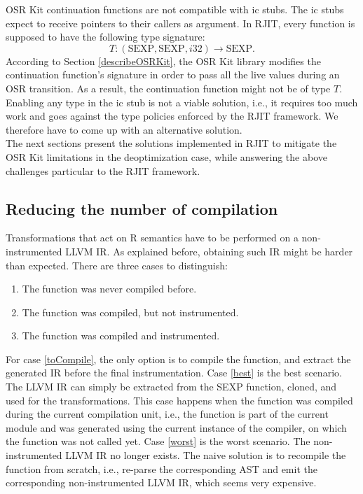 OSR Kit continuation functions are not compatible with ic stubs.
The ic stubs expect to receive pointers to their callers as argument.
In RJIT, every function is supposed to have the following type signature:
$$T: (\text{SEXP}, \text{SEXP}, i32) \rightarrow \text{SEXP}.$$
According to Section \ref{describeOSRKit}, the OSR Kit\cite{OSRKit} library modifies the continuation function's signature in order to pass all the live values during an OSR transition.
As a result, the continuation function might not be of type $T$.
Enabling any type in the ic stub is not a viable solution, i.e., it requires too much work and goes against the type policies enforced by the RJIT framework. 
We therefore have to come up with an alternative solution.\\

The next sections present the solutions implemented in RJIT to mitigate the OSR Kit limitations in the deoptimization case, while answering the above challenges particular to the RJIT framework.\\

\subsection{Reducing the number of compilation}\label{section:reducecompilations}

Transformations that act on R semantics have to be performed on a non-instrumented LLVM IR.
As explained before, obtaining such IR might be harder than expected. 
There are three cases to distinguish:
\begin{enumerate}
    \item The function was never compiled before.\label{toCompile}
    \item The function was compiled, but not instrumented.\label{best} 
    \item The function was compiled and instrumented.\label{worst}
\end{enumerate}

For case \ref{toCompile}, the only option is to compile the function, and extract the generated IR before the final instrumentation.
Case \ref{best} is the best scenario.
The LLVM IR can simply be extracted from the SEXP function, cloned, and used for the transformations.
This case happens when the function was compiled during the current compilation unit, i.e., the function is part of the current module and was generated using the current instance of the compiler, on which the  function was not called yet.
Case \ref{worst} is the worst scenario.
The non-instrumented LLVM IR no longer exists.
The naive solution is to recompile the function from scratch, i.e., re-parse the corresponding AST and emit the corresponding non-instrumented LLVM IR, which seems very expensive.\\

